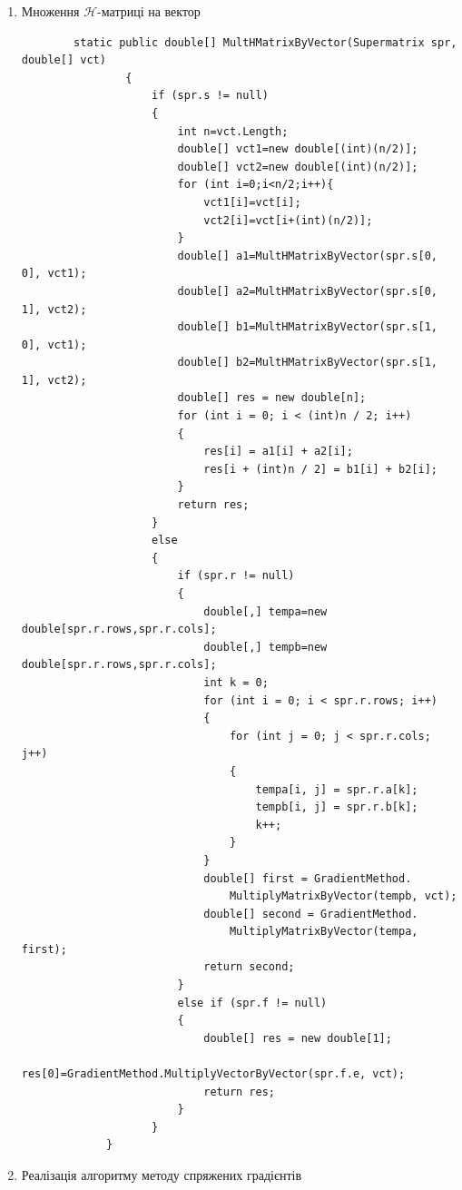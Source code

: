 \documentclass[12pt]{report}
\begin{document}
\begin{enumerate}
\begin{verbatim}
		\end{verbatim}
		\item Множення $\mathcal{H}$-матриці на вектор
		\begin{verbatim}
		static public double[] MultHMatrixByVector(Supermatrix spr, double[] vct)
		        {
		            if (spr.s != null)
		            {
		                int n=vct.Length;
		                double[] vct1=new double[(int)(n/2)];
		                double[] vct2=new double[(int)(n/2)];
		                for (int i=0;i<n/2;i++){
		                    vct1[i]=vct[i];
		                    vct2[i]=vct[i+(int)(n/2)];
		                }
		                double[] a1=MultHMatrixByVector(spr.s[0, 0], vct1);
		                double[] a2=MultHMatrixByVector(spr.s[0, 1], vct2);
		                double[] b1=MultHMatrixByVector(spr.s[1, 0], vct1);
		                double[] b2=MultHMatrixByVector(spr.s[1, 1], vct2);
		                double[] res = new double[n];
		                for (int i = 0; i < (int)n / 2; i++)
		                {
		                    res[i] = a1[i] + a2[i];
		                    res[i + (int)n / 2] = b1[i] + b2[i];
		                }
		                return res;
		            }
		            else
		            {
		                if (spr.r != null)
		                {
		                    double[,] tempa=new double[spr.r.rows,spr.r.cols];
		                    double[,] tempb=new double[spr.r.rows,spr.r.cols];
		                    int k = 0;
		                    for (int i = 0; i < spr.r.rows; i++)
		                    {
		                        for (int j = 0; j < spr.r.cols; j++)
		                        {
		                            tempa[i, j] = spr.r.a[k];
		                            tempb[i, j] = spr.r.b[k];
		                            k++;
		                        }
		                    }
		                    double[] first = GradientMethod.
		                        MultiplyMatrixByVector(tempb, vct);
		                    double[] second = GradientMethod.
		                        MultiplyMatrixByVector(tempa, first);
		                    return second;
		                }
		                else if (spr.f != null)
		                {
		                    double[] res = new double[1];
		                    res[0]=GradientMethod.MultiplyVectorByVector(spr.f.e, vct);
		                    return res;
		                }
		            }
		     }
		\end{verbatim}
		\item Реалізація алгоритму методу спряжених градієнтів
		\begin{verbatim}

\end{verbatim}
\end{enumerate}
\end{document}
